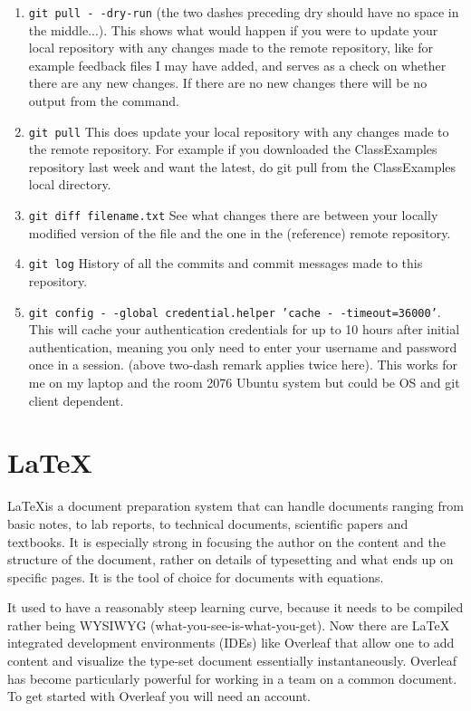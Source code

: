 \begin{enumerate}
    \item \texttt{git pull - -dry-run}
    (the two dashes preceding dry should have no space in the middle...).
    This shows what would happen if 
    you were to update your local repository with any changes made to the remote repository, like for 
    example feedback files I may have added, and serves as a check on whether there 
    are any new changes. 
    If there are no new changes there will be no output from the command. 
    \item \texttt{git pull} This does update your local repository with any changes made to 
    the remote repository. For example if you downloaded the ClassExamples repository last week 
    and want the latest, do git pull from the ClassExamples local directory.
    \item \texttt{git diff filename.txt} See what changes there are between your locally modified  version of the file and the one in the (reference) remote repository.
    \item \texttt{git log} History of all the commits and commit messages made to this repository.
    \item \texttt{git config - -global credential.helper 'cache - -timeout=36000'}. This will cache your authentication credentials for up to 10 hours after initial authentication, meaning you only need to enter your username and password once in a session. (above two-dash remark applies twice here).
    This works for me on my laptop and the room 2076 Ubuntu system but could be OS and git 
    client dependent.
\end{enumerate}

\section{\LaTeX}
\LaTeX is a document preparation system that can handle documents ranging 
from basic notes, to lab reports, to technical documents, 
scientific papers and textbooks. It is especially strong 
in focusing the author on the content and the structure 
of the document, rather on details of typesetting and 
what ends up on specific pages. It is the tool of choice 
for documents with equations.

It used to have a reasonably steep learning curve, because it needs to be compiled 
rather being WYSIWYG (what-you-see-is-what-you-get). Now there are LaTeX 
integrated development environments (IDEs) like Overleaf that allow one 
to add content and visualize the type-set document essentially instantaneously.
Overleaf has become particularly powerful for working in a team on a common document.
To get started with Overleaf you will need an account.


